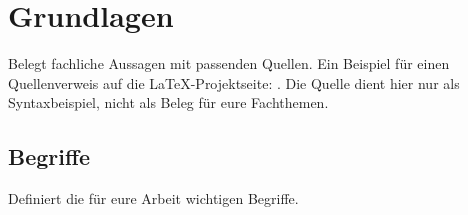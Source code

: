 \chapter{Grundlagen}\label{chap:grundlagen}
Belegt fachliche Aussagen mit passenden Quellen. Ein Beispiel für einen
Quellenverweis auf die LaTeX-Projektseite: \autocite{latexproject}.
Die Quelle dient hier nur als Syntaxbeispiel, nicht als Beleg für eure Fachthemen.
\section{Begriffe}
Definiert die für eure Arbeit wichtigen Begriffe.
